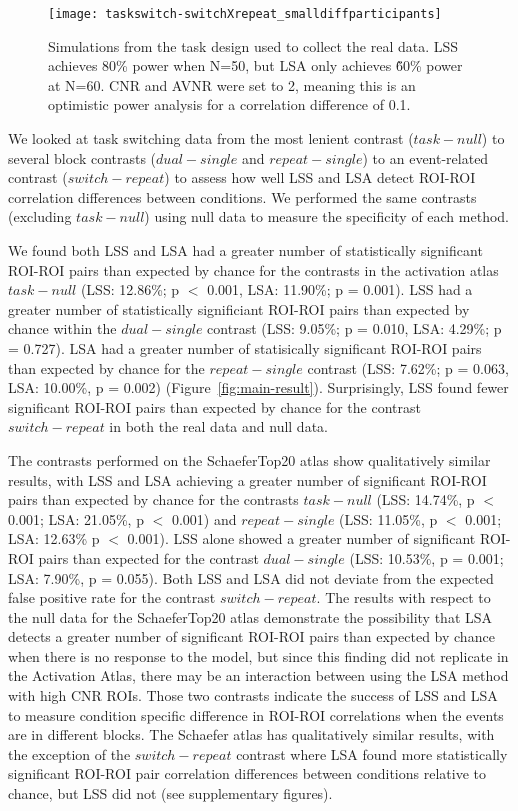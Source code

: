 \documentclass[phd,appendix,figures]{uithesis}
\begin{document}
\begin{figure}[H]
  \texttt{[image: taskswitch-switchXrepeat\_smalldiffparticipants]}
  \caption{
    Simulations from the task design used to collect the real data.
    LSS achieves 80\% power when N=50, but LSA only achieves \~60\% power at N=60.
    CNR and AVNR were set to 2, meaning this is an optimistic power analysis
    for a correlation difference of 0.1.
  }
  \label{fig:taskswitch-simulation}
\end{figure}

We looked at task switching data from the most lenient
contrast ($task - null$) to several block contrasts ($dual - single$ and $repeat - single$)
to an event-related contrast ($switch - repeat$)
to assess how well LSS and LSA detect ROI-ROI correlation differences between conditions.
We performed the same contrasts (excluding $task - null$)
using null data to measure the specificity of each method.

We found both LSS and LSA had a greater number of statistically significant ROI-ROI pairs than expected by chance
for the contrasts in the activation atlas $task - null$ (LSS: 12.86\%; p $<$ 0.001, LSA: 11.90\%; p = 0.001).
LSS had a greater number of statistically significiant ROI-ROI pairs than expected by chance within the 
$dual - single$ contrast (LSS: 9.05\%; p = 0.010, LSA: 4.29\%; p = 0.727).
LSA had a greater number of statisically significant ROI-ROI pairs than expected by chance for the
$repeat - single$ contrast (LSS: 7.62\%; p = 0.063, LSA: 10.00\%, p = 0.002) (Figure~\ref{fig:main-result}).
Surprisingly, LSS found fewer significant ROI-ROI pairs than expected by chance
for the contrast $switch - repeat$ in both the real data and null data. 

The contrasts performed on the SchaeferTop20 atlas show qualitatively similar results,
with LSS and LSA achieving a greater number of significant ROI-ROI pairs
than expected by chance for the contrasts
$task - null$ (LSS: 14.74\%, p $<$ 0.001; LSA: 21.05\%, p $<$ 0.001) and
$repeat - single$ (LSS: 11.05\%, p $<$ 0.001; LSA: 12.63\% p $<$ 0.001).
LSS alone showed a greater number of significant ROI-ROI pairs than expected
for the contrast
$dual - single$ (LSS: 10.53\%, p = 0.001; LSA: 7.90\%, p = 0.055).
Both LSS and LSA did not deviate from the expected false positive rate for the contrast
$switch - repeat$.
The results with respect to the null data for the SchaeferTop20 atlas demonstrate
the possibility that LSA detects a greater number of significant ROI-ROI
pairs than expected by chance when there is no response to the model, but since this finding did not
replicate in the Activation Atlas, there may be an interaction between using the LSA method with
high CNR ROIs.
Those two contrasts indicate the success of LSS and LSA to measure
condition specific difference in ROI-ROI correlations when the events are in different blocks.
The Schaefer atlas has qualitatively similar results, with the exception of
the $switch - repeat$ contrast where LSA found more statistically significant
ROI-ROI pair correlation differences between conditions relative to chance,
but LSS did not (see supplementary figures).
\end{document}
